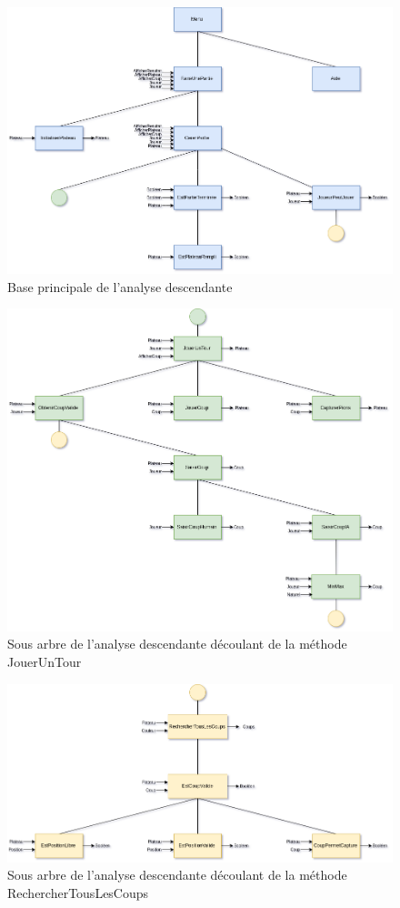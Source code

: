 \begin{figure}[h]
  \includegraphics[width=18cm]{./sourcesIMAGES/analyse_main.png}
  \caption{Base principale de l'analyse descendante}
\end{figure}
\newpage
\begin{figure}[h]
  \includegraphics[width=18cm]{./sourcesIMAGES/analyse_jouerUnTour.png}
  \caption{Sous arbre de l'analyse descendante découlant de la méthode JouerUnTour}
\end{figure}
\newpage
\begin{figure}[h]
  \includegraphics[width=18cm]{./sourcesIMAGES/analyse_chercherTousLesCoups.png}
  \caption{Sous arbre de l'analyse descendante découlant de la méthode RechercherTousLesCoups}
\end{figure}
\newpage
